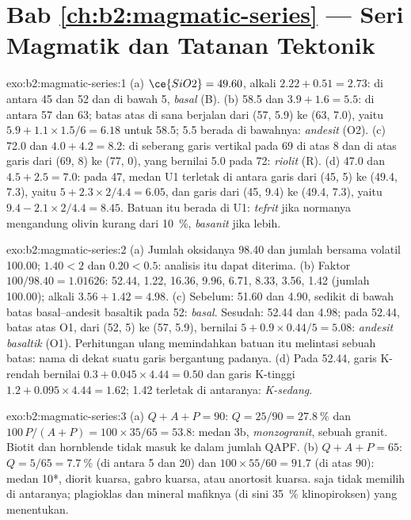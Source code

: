 \section*{Bab \ref{ch:b2:magmatic-series} --- Seri Magmatik dan Tatanan Tektonik}

\begin{solution}{exo:b2:magmatic-series:1}
(a) $\ce{SiO2} = 49.60$, alkali $2.22 + 0.51 = 2.73$: di antara 45 dan 52 dan di bawah 5,
\emph{basal} (B). (b) 58.5 dan $3.9 + 1.6 = 5.5$: di antara 57 dan 63; batas
atas di sana berjalan dari (57, 5.9) ke (63, 7.0), yaitu $5.9 + 1.1\times1.5/6 = 6.18$
untuk 58.5; 5.5 berada di bawahnya: \emph{andesit} (O2). (c) 72.0 dan $4.0 + 4.2 = 8.2$:
di seberang garis vertikal pada 69 di atas 8 dan di atas garis dari (69, 8) ke (77, 0), yang
bernilai 5.0 pada 72: \emph{riolit} (R). (d) 47.0 dan $4.5 + 2.5 = 7.0$: pada 47, medan U1
terletak di antara garis dari (45, 5) ke (49.4, 7.3), yaitu $5 + 2.3\times2/4.4 = 6.05$, dan
garis dari (45, 9.4) ke (49.4, 7.3), yaitu $9.4 - 2.1\times2/4.4 = 8.45$. Batuan itu
berada di U1: \emph{tefrit} jika normanya mengandung olivin kurang dari \qty{10}{\percent},
\emph{basanit} jika lebih.
\end{solution}

\begin{solution}{exo:b2:magmatic-series:2}
(a) Jumlah oksidanya 98.40 dan jumlah bersama volatil 100.00;
 $1.40 < 2$ dan  $0.20 < 0.5$: analisis itu dapat diterima. (b) Faktor
$100/98.40 = 1.01626$:  52.44,  1.22,  16.36,
 9.96,  6.71,  8.33,  3.56,  1.42
(jumlah 100.00); alkali $3.56 + 1.42 = 4.98$. (c) Sebelum: 51.60 dan 4.90, sedikit di bawah
batas basal--andesit basaltik pada 52: \emph{basal}. Sesudah: 52.44 dan 4.98; pada
52.44, batas atas O1, dari (52, 5) ke (57, 5.9), bernilai $5 + 0.9\times0.44/5
= 5.08$: \emph{andesit basaltik} (O1). Perhitungan ulang memindahkan batuan itu melintasi sebuah
batas: nama di dekat suatu garis bergantung padanya. (d) Pada 52.44, garis K-rendah bernilai $0.3 +
0.045\times4.44 = 0.50$ dan garis K-tinggi $1.2 + 0.095\times4.44 = 1.62$; 1.42
terletak di antaranya: \emph{K-sedang}.
\end{solution}

\begin{solution}{exo:b2:magmatic-series:3}
(a) $Q + A + P = 90$: $Q = 25/90 = \qty{27.8}{\percent}$ dan $100\,P/(A + P) =
100\times35/65 = 53.8$: medan 3b, \emph{monzogranit}, sebuah granit. Biotit dan
hornblende tidak masuk ke dalam jumlah QAPF. (b) $Q + A + P = 65$: $Q = 5/65 =
\qty{7.7}{\percent}$ (di antara 5 dan 20) dan $100\times55/60 = 91.7$ (di atas 90): medan
10*, diorit kuarsa, gabro kuarsa, atau anortosit kuarsa.  saja tidak
memilih di antaranya; plagioklas dan mineral mafiknya (di sini
\qty{35}{\percent} klinopiroksen) yang menentukan.
\end{solution}


